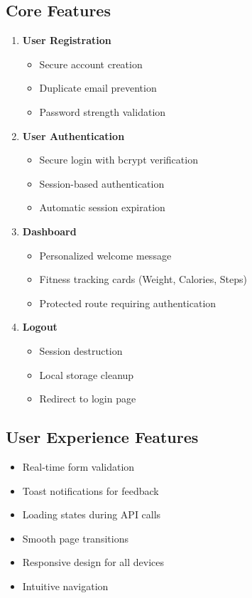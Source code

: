\documentclass[12pt,a4paper]{article}
\begin{document}
\subsection{Core Features}
\begin{enumerate}
    \item \textbf{User Registration}
    \begin{itemize}
        \item Secure account creation
        \item Duplicate email prevention
        \item Password strength validation
    \end{itemize}
    
    \item \textbf{User Authentication}
    \begin{itemize}
        \item Secure login with bcrypt verification
        \item Session-based authentication
        \item Automatic session expiration
    \end{itemize}
    
    \item \textbf{Dashboard}
    \begin{itemize}
        \item Personalized welcome message
        \item Fitness tracking cards (Weight, Calories, Steps)
        \item Protected route requiring authentication
    \end{itemize}
    
    \item \textbf{Logout}
    \begin{itemize}
        \item Session destruction
        \item Local storage cleanup
        \item Redirect to login page
    \end{itemize}
\end{enumerate}

\subsection{User Experience Features}
\begin{itemize}
    \item Real-time form validation
    \item Toast notifications for feedback
    \item Loading states during API calls
    \item Smooth page transitions
    \item Responsive design for all devices
    \item Intuitive navigation
\end{itemize}
\end{document}
